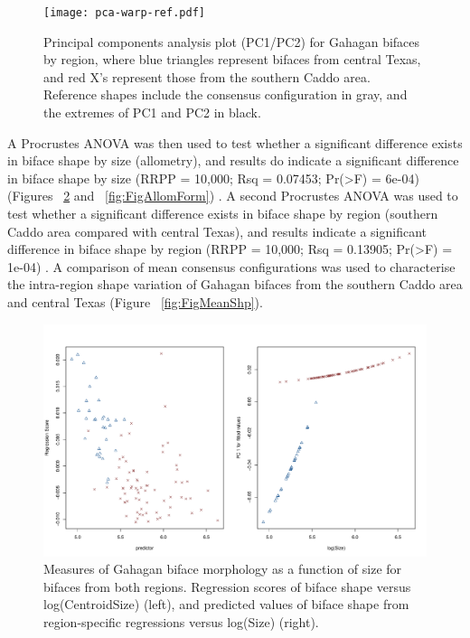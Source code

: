 \documentclass[review]{elsarticle}
\begin{document}
\begin{figure}[h!]\centering
\texttt{[image: pca-warp-ref.pdf]}
\caption{Principal components analysis plot (PC1/PC2) for Gahagan bifaces by region, where blue triangles represent bifaces from central Texas, and red X's represent those from the southern Caddo area. Reference shapes include the consensus configuration in gray, and the extremes of PC1 and PC2 in black.}
\label{fig:FigPCA}
\end{figure}

A Procrustes ANOVA was then used to test whether a significant difference exists in biface shape by size (allometry), and results do indicate a significant difference in biface shape by size (RRPP = 10,000; Rsq = 0.07453; Pr(>F) = 6e-04) (Figures ~\ref{fig:FigAllom} and ~\ref{fig:FigAllomForm}) \citep{RN20850}. A second Procrustes ANOVA was used to test whether a significant difference exists in biface shape by region (southern Caddo area compared with central Texas), and results indicate a significant difference in biface shape by region (RRPP = 10,000; Rsq = 0.13905; Pr(>F) = 1e-04) \citep{RN20850}. A comparison of mean consensus configurations was used to characterise the intra-region shape variation of Gahagan bifaces from the southern Caddo area and central Texas (Figure ~\ref{fig:FigMeanShp}).

\begin{figure}[h!]\centering
\includegraphics[width=\linewidth]{analysis/images/gbiface-allometry.pdf}
\caption{Measures of Gahagan biface morphology as a function of size for bifaces from both regions. Regression scores of biface shape versus log(CentroidSize) (left), and predicted values of biface shape from region-specific regressions versus log(Size) (right).}
\label{fig:FigAllom}
\end{figure}
\end{document}
